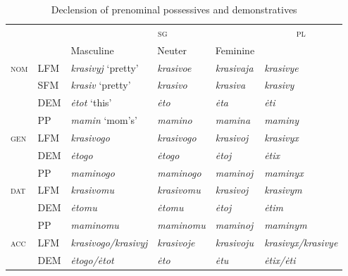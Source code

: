 \documentclass[output=paper]{langscibook}
\begin{document}
\begin{table}\caption{Declension of prenominal possessives and demonstratives\label{tab1:paradigm}}
\small
\begin{tabular}{>{\scshape}llllll} 
  \lsptoprule
    &            &                      \multicolumn{3}{c}{\textsc{sg}}     & \multicolumn{1}{c}{\textsc{pl}}\\\cmidrule(lr){3-5}
    &            &                      Masculine &                     Neuter    &         Feminine        &\\
  \midrule
  nom&     LFM         &       \textit{krasivyj} `pretty'    & \textit{krasivoe}   & \textit{krasivaja}   & \textit{krasivye}\\
  &     SFM         &       \textit{krasiv} `pretty'    & \textit{krasivo}   & \textit{krasiva}   & \textit{krasivy}\\
  &               DEM         &       \textit{ėtot} `this'        & \textit{ėto}       & \textit{ėta}       & \textit{ėti}\\
  &               PP          &       \textit{mamin} `mom's'       & \textit{mamino}    & \textit{mamina}    & \textit{maminy}\\
  \midrule 
  gen&       LFM         &       \textit{krasivogo}          & \textit{krasivogo} & \textit{krasivoj}  & \textit{krasivyx}\\
  &               DEM         &       \textit{ėtogo}              & \textit{ėtogo}     & \textit{ėtoj}      & \textit{ėtix}\\
  &               PP          &       \textit{maminogo}           & \textit{maminogo}  & \textit{maminoj}   & \textit{maminyx}\\
  \midrule
  dat&         LFM         &       \textit{krasivomu}          & \textit{krasivomu} & \textit{krasivoj}  & \textit{krasivym}\\
  &               DEM         &       \textit{ėtomu}              & \textit{ėtomu}     & \textit{ėtoj}      & \textit{ėtim}\\
  &               PP          &       \textit{maminomu}           & \textit{maminomu}  & \textit{maminoj}   & \textit{maminym}\\
  \midrule
  acc&     LFM         &       \textit{krasivogo/krasivyj} & \textit{krasivoje} & \textit{krasivoju} & \textit{krasivyx/krasivye}\\
  &               DEM         &       \textit{ėtogo/ėtot}         & \textit{ėto}       & \textit{ėtu}       & \textit{ėtix/ėti}\\

\end{tabular}
\end{table}
\end{document}
